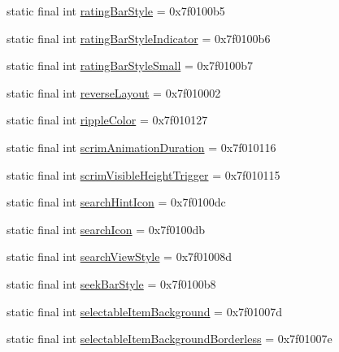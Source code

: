 \begin{CompactItemize}
static final int \hyperlink{classandroid_1_1support_1_1v7_1_1mediarouter_1_1_r_1_1attr_63ffafc6d4fcc4ad1c88e295658b8276}{ratingBarStyle} = 0x7f0100b5
\item 
static final int \hyperlink{classandroid_1_1support_1_1v7_1_1mediarouter_1_1_r_1_1attr_ad4cac931c538f5a0abc85455529a66a}{ratingBarStyleIndicator} = 0x7f0100b6
\item 
static final int \hyperlink{classandroid_1_1support_1_1v7_1_1mediarouter_1_1_r_1_1attr_58ebc9a84a0f0b7f27bed10a47a868b0}{ratingBarStyleSmall} = 0x7f0100b7
\item 
static final int \hyperlink{classandroid_1_1support_1_1v7_1_1mediarouter_1_1_r_1_1attr_66aca125f0385edd577f5a27196a8b61}{reverseLayout} = 0x7f010002
\item 
static final int \hyperlink{classandroid_1_1support_1_1v7_1_1mediarouter_1_1_r_1_1attr_b48d03abd24bd7c2260f6918fe5cf7b2}{rippleColor} = 0x7f010127
\item 
static final int \hyperlink{classandroid_1_1support_1_1v7_1_1mediarouter_1_1_r_1_1attr_ab9957d818ad4b34f52a0822cae9cf4c}{scrimAnimationDuration} = 0x7f010116
\item 
static final int \hyperlink{classandroid_1_1support_1_1v7_1_1mediarouter_1_1_r_1_1attr_beffb85734a1b5db6ee180e7df96cdb3}{scrimVisibleHeightTrigger} = 0x7f010115
\item 
static final int \hyperlink{classandroid_1_1support_1_1v7_1_1mediarouter_1_1_r_1_1attr_1875c8a6efc7e209e7bec5462987e9f3}{searchHintIcon} = 0x7f0100dc
\item 
static final int \hyperlink{classandroid_1_1support_1_1v7_1_1mediarouter_1_1_r_1_1attr_3c6a95c2b2f0d6c065a29795993318cc}{searchIcon} = 0x7f0100db
\item 
static final int \hyperlink{classandroid_1_1support_1_1v7_1_1mediarouter_1_1_r_1_1attr_a9c2a37433293213b9cbc81cded7fa30}{searchViewStyle} = 0x7f01008d
\item 
static final int \hyperlink{classandroid_1_1support_1_1v7_1_1mediarouter_1_1_r_1_1attr_7d5cbc603d50b36333b90f328322d3fa}{seekBarStyle} = 0x7f0100b8
\item 
static final int \hyperlink{classandroid_1_1support_1_1v7_1_1mediarouter_1_1_r_1_1attr_b852a7bffd27029a855119a2eeef1643}{selectableItemBackground} = 0x7f01007d
\item 
static final int \hyperlink{classandroid_1_1support_1_1v7_1_1mediarouter_1_1_r_1_1attr_e61b057e76376350ec6852c31a9b1e10}{selectableItemBackgroundBorderless} = 0x7f01007e
\item 

\end{CompactItemize}
